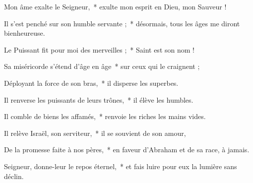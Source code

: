 \item Mon âme exalte le Seigneur,~* exulte mon esprit en Dieu, mon Sauveur !

\item Il s'est penché sur son humble servante ;~* désormais, tous les âges me diront bienheureuse.

\item Le Puissant fit pour moi des merveilles ;~* Saint est son nom !

\item Sa miséricorde s'étend d'âge en âge~* sur ceux qui le craignent ;

\item Déployant la force de son bras,~* il disperse les superbes.

\item Il renverse les puissants de leurs trônes,~* il élève les humbles.

\item Il comble de biens les affamés,~* renvoie les riches les mains vides.

\item Il relève Israël, son serviteur,~* il se souvient de son amour,

\item De la promesse faite à nos pères,~* en faveur d'Abraham et de sa race, à jamais.

\item Seigneur, donne-leur le repos éternel,~* et fais luire pour eux la lumière sans déclin.